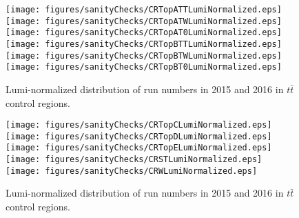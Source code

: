 
\begin{figure}[htbp]
\begin{center} 
\texttt{[image: figures/sanityChecks/CRTopATTLumiNormalized.eps]}
\texttt{[image: figures/sanityChecks/CRTopATWLumiNormalized.eps]}
\texttt{[image: figures/sanityChecks/CRTopAT0LumiNormalized.eps]}
\texttt{[image: figures/sanityChecks/CRTopBTTLumiNormalized.eps]}
\texttt{[image: figures/sanityChecks/CRTopBTWLumiNormalized.eps]}
\texttt{[image: figures/sanityChecks/CRTopBT0LumiNormalized.eps]}
\caption{Lumi-normalized distribution of run numbers in 2015 and 2016 in $t\bar{t}$ control regions.}
\label{fig:Fit2ele_1}
\end{center}
\end{figure}

\begin{figure}[htbp]
\begin{center} 

\texttt{[image: figures/sanityChecks/CRTopCLumiNormalized.eps]}
\texttt{[image: figures/sanityChecks/CRTopDLumiNormalized.eps]}
\texttt{[image: figures/sanityChecks/CRTopELumiNormalized.eps]}
\texttt{[image: figures/sanityChecks/CRSTLumiNormalized.eps]}
\texttt{[image: figures/sanityChecks/CRWLumiNormalized.eps]}
\caption{Lumi-normalized distribution of run numbers in 2015 and 2016 in $t\bar{t}$ control regions.}
\label{fig:Fit2ele_2}
\end{center}
\end{figure}

